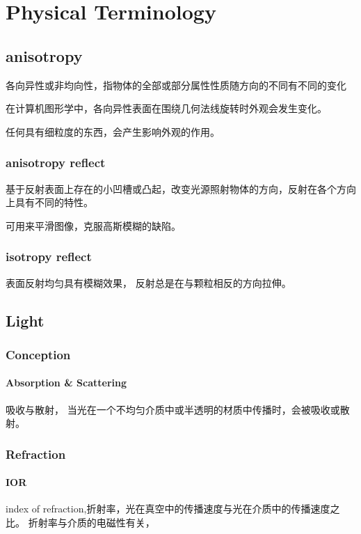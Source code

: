 \chapter{Physical Terminology}

\section{anisotropy}
各向异性或非均向性，指物体的全部或部分属性性质随方向的不同有不同的变化

在计算机图形学中，各向异性表面在围绕几何法线旋转时外观会发生变化。

任何具有细粒度的东西，会产生影响外观的作用。

\subsection{anisotropy reflect}
基于反射表面上存在的小凹槽或凸起，改变光源照射物体的方向，反射在各个方向上具有不同的特性。

可用来平滑图像，克服高斯模糊的缺陷。

\subsection{isotropy reflect}
表面反射均匀具有模糊效果， 反射总是在与颗粒相反的方向拉伸。

\section{Light}

\subsection{Conception}

\subsubsection{Absorption \& Scattering}

吸收与散射， 当光在一个不均匀介质中或半透明的材质中传播时，会被吸收或散射。

\subsection{Refraction}

\subsubsection{IOR}
index of refraction,折射率，光在真空中的传播速度与光在介质中的传播速度之比。
折射率与介质的电磁性有关，

